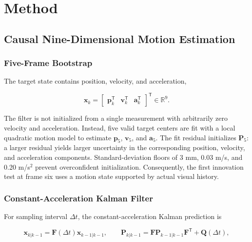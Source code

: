 \documentclass[conference]{IEEEtran}
\begin{document}
\section{Method}

\subsection{Causal Nine-Dimensional Motion Estimation}

\subsubsection{Five-Frame Bootstrap}

The target state contains position, velocity, and acceleration,

\begin{equation}
\mathbf{x}_k=
\begin{bmatrix}
\mathbf{p}_k^{\mathsf T}&\mathbf{v}_k^{\mathsf T}&\mathbf{a}_k^{\mathsf T}
\end{bmatrix}^{\mathsf T}\in\mathbb{R}^{9}.

\end{equation}

The filter is not initialized from a single measurement with arbitrarily zero velocity and acceleration. Instead, five valid target centers are fit with a local quadratic motion model to estimate \(\mathbf{p}_5\), \(\mathbf{v}_5\), and \(\mathbf{a}_5\). The fit residual initializes \(\mathbf{P}_5\): a larger residual yields larger uncertainty in the corresponding position, velocity, and acceleration components. Standard-deviation floors of 3 mm, 0.03 m/s, and 0.20 m/s$^2$ prevent overconfident initialization. Consequently, the first innovation test at frame six uses a motion state supported by actual visual history.

\subsubsection{Constant-Acceleration Kalman Filter}

For sampling interval \(\Delta t\), the constant-acceleration Kalman prediction \cite{ref11} is

\begin{equation}
\mathbf{x}_{k|k-1}=\mathbf{F}(\Delta t)\mathbf{x}_{k-1|k-1},\qquad
\mathbf{P}_{k|k-1}=\mathbf{F}\mathbf{P}_{k-1|k-1}\mathbf{F}^{\mathsf T}+\mathbf{Q}(\Delta t),

\end{equation}
\end{document}
